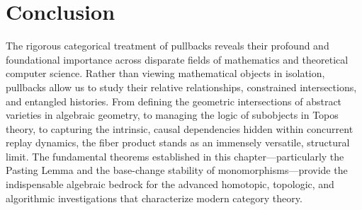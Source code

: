 \section{Conclusion}

The rigorous categorical treatment of pullbacks reveals their profound and foundational importance across disparate fields of mathematics and theoretical computer science. Rather than viewing mathematical objects in isolation, pullbacks allow us to study their relative relationships, constrained intersections, and entangled histories. From defining the geometric intersections of abstract varieties in algebraic geometry, to managing the logic of subobjects in Topos theory, to capturing the intrinsic, causal dependencies hidden within concurrent replay dynamics, the fiber product stands as an immensely versatile, structural limit. The fundamental theorems established in this chapter—particularly the Pasting Lemma and the base-change stability of monomorphisms—provide the indispensable algebraic bedrock for the advanced homotopic, topologic, and algorithmic investigations that characterize modern category theory.